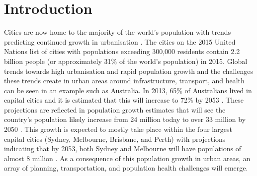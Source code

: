 \documentclass[10pt,letterpaper]{article}
\begin{document}
 

\linenumbers



\section*{Introduction}\label{sec:introduction}

\cite{Bruce1971}


Cities are now home to the majority of the world's population with trends predicting continued growth in urbanisation \cite{UNDESA2015,WHO2016}. The cities on the 2015 United Nations list of cities with populations exceeding 300,000 residents \cite{UN2014} contain 2.2 billion people (or approximately 31\% of the world's population) in 2015. Global trends towards high urbanisation and rapid population growth and the challenges these trends create in urban areas around infrastructure, transport, and health can be seen in an example such as Australia. In 2013, 65\% of Australians lived in capital cities and it is estimated that this will increase to 72\% by 2053  \cite{ABS2008}. These projections are reflected in population growth estimates that will see the country's population likely increase from 24 million today to over 33 million by 2050 \cite{ABS2008}. This growth is expected to mostly take place within the four largest capital cities (Sydney, Melbourne, Brisbane, and Perth) with projections indicating that by 2053, both Sydney and Melbourne will have populations of almost 8 million \cite{CommonwealthofAustralia2010}. As a consequence of this population growth in urban areas, an array of planning, transportation, and population health challenges will emerge.
\end{document}
